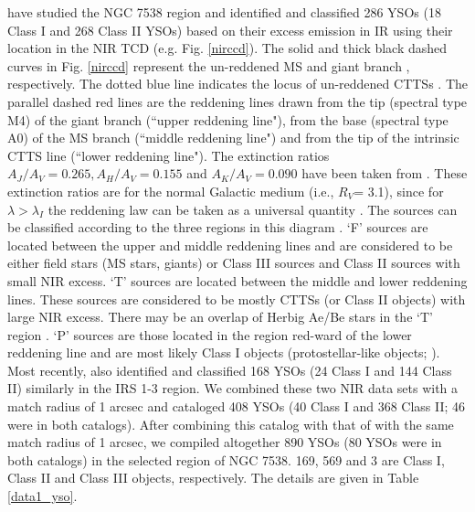 \documentclass[a4paper,fleqn,usenatbib,useAMS]{mnras}
\begin{document}
\citet{2004ApJ...616.1042O} have  studied the NGC 7538 region and identified and classified 
286 YSOs (18 Class I and 268 Class II YSOs) based on their excess emission in IR
using their location in the NIR TCD 
(e.g. Fig. \ref{nirccd}).
The solid and thick black dashed curves in Fig. \ref{nirccd} represent the un-reddened MS and
giant branch \citep{1988PASP..100.1134B}, respectively. The dotted blue line indicates the locus
of un-reddened CTTSs \citep{1997AJ....114..288M}. 
The parallel dashed red lines are the reddening lines drawn from the tip
(spectral type M4) of the giant branch (``upper reddening line"), from the base
(spectral type A0) of the MS branch (``middle reddening line") and from the tip of the
intrinsic CTTS line (``lower reddening line"). The extinction ratios
$A_J/A_V = 0.265, A_H/A_V = 0.155$ and $A_K/A_V=0.090$ have been taken from \citet{1981ApJ...249..481C}. 
These extinction ratios are for the normal Galactic medium (i.e., $R_V$= 3.1),
since for $\lambda > \lambda_I$ the reddening law can 
be taken as a universal quantity \citep{1989ApJ...345..245C,1995ApJS..101..335H}. 
The sources can be classified according to the three regions in this diagram \citep[cf.][]{2004ApJ...608..797O}.
`F' sources are located between the upper and middle reddening lines and are considered
to be either field stars (MS stars, giants) or Class III sources and Class II sources with small
NIR excess. `T' sources are located between the middle and lower reddening lines. These sources
are considered to be mostly CTTSs (or Class II objects) with large NIR excess. There may be an
overlap of Herbig Ae/Be stars in the `T' region \citep{1992ApJ...397..613H}. `P' sources are
those located in the region red-ward of the lower reddening line and are most likely Class I
objects (protostellar-like objects; \citet{2004ApJ...608..797O}). 
Most recently, \citet{2014MNRAS.443.3218M} also identified and classified 168 YSOs (24 Class I and 144 Class II) similarly
in the IRS 1-3 region. 
We combined these two NIR data sets with a match radius of 1 arcsec and cataloged  408 YSOs (40 Class I and 368 Class II; 46 were in both catalogs).
After combining this catalog with that of \citet[][562 YSOs]{2014MNRAS.439.3719C} 
with the same  match radius of 1 arcsec, we compiled altogether 
890 YSOs (80 YSOs were in both catalogs) in the selected region of NGC 7538.  
169, 569 and 3 are Class I, Class II and Class III objects, respectively.
The details are given in  Table \ref{data1_yso}. 
\end{document}
